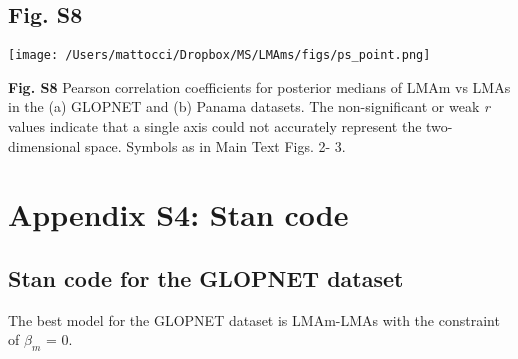 \documentclass[
  12pt,
  letterpaper,
  DIV=11,
  numbers=noendperiod]{scrartcl}
\begin{document}
\newpage

\hypertarget{fig.-s8}{%
\subsection{Fig. S8}\label{fig.-s8}}

\texttt{[image: /Users/mattocci/Dropbox/MS/LMAms/figs/ps\_point.png]}

\textbf{Fig. S8} Pearson correlation coefficients for posterior medians
of LMAm vs LMAs in the (a) GLOPNET and (b) Panama datasets. The
non-significant or weak \emph{r} values indicate that a single axis
could not accurately represent the two-dimensional space. Symbols as in
Main Text Figs. 2- 3.

\newpage

\hypertarget{appendix-s4-stan-code}{%
\section{Appendix S4: Stan code}\label{appendix-s4-stan-code}}

\hypertarget{stan-code-for-the-glopnet-dataset}{%
\subsection{Stan code for the GLOPNET
dataset}\label{stan-code-for-the-glopnet-dataset}}

The best model for the GLOPNET dataset is LMAm-LMAs with the constraint
of \(\beta_m\) = 0.
\end{document}
